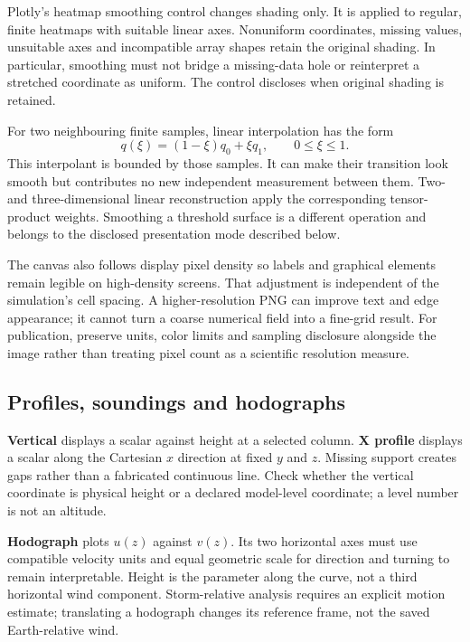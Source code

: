 Plotly's heatmap smoothing control changes shading only. It is applied to
regular, finite heatmaps with suitable linear axes. Nonuniform coordinates,
missing values, unsuitable axes and incompatible array shapes retain the
original shading. In particular, smoothing must not bridge a missing-data hole
or reinterpret a stretched coordinate as uniform. The control discloses when
original shading is retained.

For two neighbouring finite samples, linear interpolation has the form
\begin{equation}
 q(\xi)=(1-\xi)q_0+\xi q_1,\qquad 0\leq\xi\leq1.
\end{equation}
This interpolant is bounded by those samples. It can make their transition look
smooth but contributes no new independent measurement between them. Two- and
three-dimensional linear reconstruction apply the corresponding tensor-product
weights. Smoothing a threshold surface is a different operation and belongs to
the disclosed presentation mode described below.

The canvas also follows display pixel density so labels and graphical elements
remain legible on high-density screens. That adjustment is independent of the
simulation's cell spacing. A higher-resolution PNG can improve text and edge
appearance; it cannot turn a coarse numerical field into a fine-grid result.
For publication, preserve units, color limits and sampling disclosure alongside
the image rather than treating pixel count as a scientific resolution measure.

\subsection{Profiles, soundings and hodographs}
\textbf{Vertical} displays a scalar against height at a selected column.
\textbf{X profile} displays a scalar along the Cartesian $x$ direction at fixed
$y$ and $z$. Missing support creates gaps rather than a fabricated continuous
line. Check whether the vertical coordinate is physical height or a declared
model-level coordinate; a level number is not an altitude.

\textbf{Hodograph} plots $u(z)$ against $v(z)$. Its two horizontal axes must use
compatible velocity units and equal geometric scale for direction and turning
to remain interpretable. Height is the parameter along the curve, not a third
horizontal wind component. Storm-relative analysis requires an explicit motion
estimate; translating a hodograph changes its reference frame, not the saved
Earth-relative wind.

